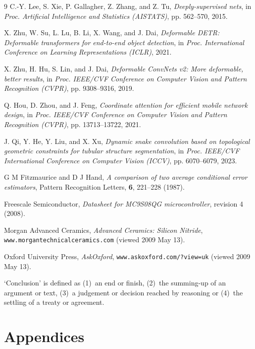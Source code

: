 \documentclass[a4paper,12pt]{article}
\begin{document}
\begin{thebibliography}{9}
C.-Y. Lee, S. Xie, P. Gallagher, Z. Zhang, and Z. Tu,
\textit{Deeply-supervised nets},
in \textit{Proc. Artificial Intelligence and Statistics (AISTATS)},
pp. 562--570,
2015.

X. Zhu, W. Su, L. Lu, B. Li, X. Wang, and J. Dai,
\textit{Deformable DETR: Deformable transformers for end-to-end object detection},
in \textit{Proc. International Conference on Learning Representations (ICLR)},
2021.

X. Zhu, H. Hu, S. Lin, and J. Dai,
\textit{Deformable ConvNets v2: More deformable, better results},
in \textit{Proc. IEEE/CVF Conference on Computer Vision and Pattern Recognition (CVPR)},
pp. 9308--9316,
2019.

Q. Hou, D. Zhou, and J. Feng,
\textit{Coordinate attention for efficient mobile network design},
in \textit{Proc. IEEE/CVF Conference on Computer Vision and Pattern Recognition (CVPR)},
pp. 13713--13722,
2021.

J. Qi, Y. He, Y. Liu, and X. Xu,
\textit{Dynamic snake convolution based on topological geometric constraints for tubular structure segmentation},
in \textit{Proc. IEEE/CVF International Conference on Computer Vision (ICCV)},
pp. 6070--6079,
2023.

G M Fitzmaurice and D J Hand, 
\textit{A comparison of two average conditional error estimators}, 
Pattern Recognition Letters, 
\textbf{6}, 
221--228 
(1987).

Freescale Semiconductor,
\textit{Datasheet for MC9S08QG microcontroller},
revision 4
(2008).

Morgan Advanced Ceramics, 
\textit{Advanced Ceramics: Silicon Nitride}, \texttt{www.morgantechnicalceramics.com} 
(viewed 2009 May 13).

Oxford University Press, 
\textit{AskOxford},
\texttt{www.askoxford.com/?view=uk}
(viewed 2009 May 13).

`Conclusion' is defined as (1)~an end or finish, (2)~the summing-up of an argument or text, (3)~a judgement or decision reached by reasoning or (4)~the settling of a treaty or agreement.
\end{thebibliography}

\clearpage %
\appendix

\section{Appendices}
\end{document}

